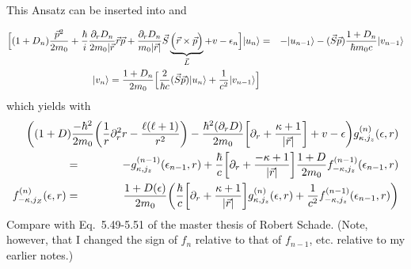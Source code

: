 \documentclass[11pt,a4paper]{report}
\begin{document}
This Ansatz can be inserted into 
and 


\begin{eqnarray}
\Bigl[
(1+D_n)\frac{\vec{p}^2}{2m_0}
+\frac{\hbar}{i}
\frac{\partial_rD_n}{2m_0|\vec{r}}\vec{r}\vec{p}
+\frac{\partial_rD_n}{m_0|\vec{r}|} \vec{S}\underbrace{
\Bigl(\vec{r}\times\vec{p}\Bigr)}_{\vec{L}}
+v-\epsilon_n\Bigr]|u_n\rangle
&=&-|u_{n-1}\rangle -(\vec{S}\vec{p})\frac{1+D_n}{\hbar m_0c}|v_{n-1}\rangle
\nonumber\\
|v_n\rangle=\frac{1+D_n}{2 m_0}
\Bigl[\frac{2}{\hbar c}
(\vec{S}\vec{p})|u_n\rangle
+\frac{1}{c^2}|v_{n-1}\rangle\Bigr]
\end{eqnarray}
which yields with 
\begin{eqnarray}
&&\hspace{-2cm}\biggl(
(1+D)\frac{-\hbar^2}{2m_0}\biggl(\frac{1}{r}\partial_r^2r
-\frac{\ell(\ell+1)}{r^2}\biggr)
-\frac{\hbar^2(\partial_r D)}{2m_0}
\biggl[\partial_r
+\frac{\kappa+1}{|\vec{r}|}\biggr]
+v-\epsilon \biggr)g^{(n)}_{\kappa,j_z}(\epsilon,r)
\nonumber\\
&=&
-g^{(n-1)}_{\kappa,j_z}(\epsilon_{n-1},r)
+
\frac{\hbar}{c}\biggl[\partial_r+\frac{-\kappa+1}{|\vec{r}|}\biggr]
\frac{1+D}{ 2m_0 }
f_{-\kappa,j_z}^{(n-1)}(\epsilon_{n-1},r)
\nonumber\\
f_{-\kappa,j_Z}^{(n)}(\epsilon,r)
&=&\frac{1+D(\epsilon)}{2 m_0}
\biggl(\frac{\hbar}{c}\biggl[\partial_r+\frac{\kappa+1}{|\vec{r}|}\biggr]
g_{\kappa,j_z}^{(n)}(\epsilon,r)
+
\frac{1}{c^2}f_{-\kappa,j_z}^{(n-1)}(\epsilon_{n-1},r)\biggr)
\end{eqnarray}
Compare with Eq.~5.49-5.51 of the master thesis of Robert
Schade\cite{schade12_thesis}.  (Note, however, that I changed the sign
of $f_{n}$ relative to that of $f_{n-1}$, etc. relative to my earlier
notes.)
\end{document}
